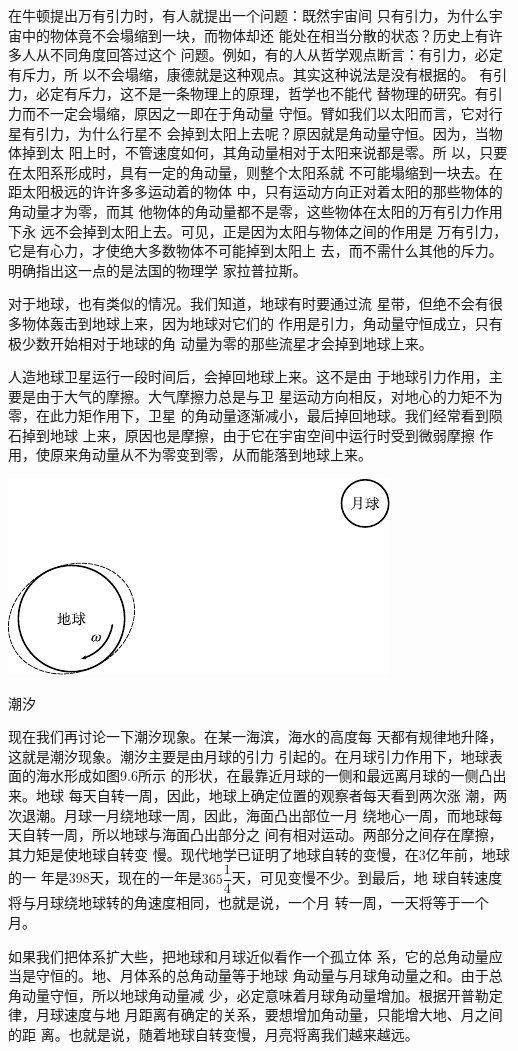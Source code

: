在牛顿提出万有引力时，有人就提出一个问题：既然宇宙间
只有引力，为什么宇宙中的物体竟不会塌缩到一块，而物体却还
能处在相当分散的状态？历史上有许多人从不同角度回答过这个
问题。例如，有的人从哲学观点断言：有引力，必定有斥力，所
以不会塌缩，康德就是这种观点。其实这种说法是没有根据的。
有引力，必定有斥力，这不是一条物理上的原理，哲学也不能代
替物理的研究。有引力而不一定会塌缩，原因之一即在于角动量
守恒。臂如我们以太阳而言，它对行星有引力，为什么行星不
会掉到太阳上去呢？原因就是角动量守恒。因为，当物体掉到太
阳上时，不管速度如何，其角动量相对于太阳来说都是零。所
以，只要在太阳系形成时，具有一定的角动量，则整个太阳系就
不可能塌缩到一块去。在距太阳极远的许许多多运动着的物体
中，只有运动方向正对着太阳的那些物体的角动量才为零，而其
他物体的角动量都不是零，这些物体在太阳的万有引力作用下永
远不会掉到太阳上去。可见，正是因为太阳与物体之间的作用是
万有引力，它是有心力，才使绝大多数物体不可能掉到太阳上
去，而不需什么其他的斥力。明确指出这一点的是法国的物理学
家拉普拉斯。

对于地球，也有类似的情况。我们知道，地球有时要通过流
星带，但绝不会有很多物体轰击到地球上来，因为地球对它们的
作用是引力，角动量守恒成立，只有极少数开始相对于地球的角
动量为零的那些流星才会掉到地球上来。

人造地球卫星运行一段时间后，会掉回地球上来。这不是由
于地球引力作用，主要是由于大气的摩擦。大气摩擦力总是与卫
星运动方向相反，对地心的力矩不为零，在此力矩作用下，卫星
的角动量逐渐减小，最后掉回地球。我们经常看到陨石掉到地球
上来，原因也是摩擦，由于它在宇宙空间中运行时受到微弱摩擦
作用，使原来角动量从不为零变到零，从而能落到地球上来。
\begin{figurex}
  \centering
  \includegraphics{figure/fig09.06}
  \caption{潮汐}
  \label{fig:09.06}
\end{figurex}

现在我们再讨论一下潮汐现象。在某一海滨，海水的高度每
天都有规律地升降，这就是潮汐现象。潮汐主要是由月球的引力
引起的。在月球引力作用下，地球表面的海水形成如图9.6所示
的形状，在最靠近月球的一侧和最远离月球的一侧凸出来。地球
每天自转一周，因此，地球上确定位置的观察者每天看到两次涨
潮，两次退潮。月球一月绕地球一周，因此，海面凸出部位一月
绕地心一周，而地球每天自转一周，所以地球与海面凸出部分之
间有相对运动。两部分之间存在摩擦，其力矩是使地球自转变
慢。现代地学已证明了地球自转的变慢，在3亿年前，地球的一
年是398天，现在的一年是$ 3 6 5  \dfrac { 1 } { 4 } $天，可见变慢不少。到最后，地
球自转速度将与月球绕地球转的角速度相同，也就是说，一个月
转一周，一天将等于一个月。

如果我们把体系扩大些，把地球和月球近似看作一个孤立体
系，它的总角动量应当是守恒的。地、月体系的总角动量等于地球
角动量与月球角动量之和。由于总角动量守恒，所以地球角动量减
少，必定意味着月球角动量增加。根据开普勒定律，月球速度与地
月距离有确定的关系，要想增加角动量，只能增大地、月之间的距
离。也就是说，随着地球自转变慢，月亮将离我们越来越远。
